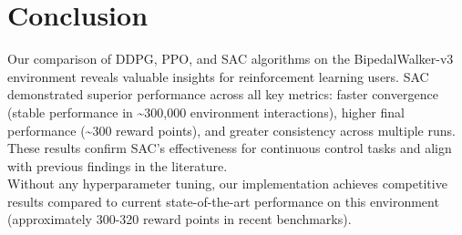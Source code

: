 \section{Conclusion}



Our comparison of \gls{DDPG}, \gls{PPO}, and \gls{SAC} algorithms on the BipedalWalker-v3 environment reveals valuable insights for reinforcement learning users. \gls{SAC} demonstrated superior performance across all key metrics: faster convergence (stable performance in \textasciitilde300,000 environment interactions), higher final performance (\textasciitilde300 reward points), and greater consistency across multiple runs. These results confirm \gls{SAC}'s effectiveness for continuous control tasks and align with previous findings in the literature.\\

\noindent Without any hyperparameter tuning, our implementation achieves competitive results compared to current state-of-the-art performance on this environment (approximately 300-320 reward points in recent benchmarks).\\ %

